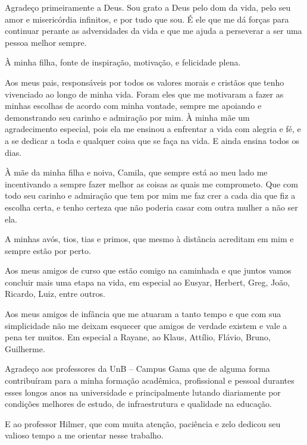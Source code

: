 \begin{agradecimentos}
Agradeço primeiramente a Deus. Sou grato a Deus pelo dom da vida, pelo seu amor e misericórdia infinitos, e por tudo que sou. É ele que me dá forças para continuar perante as adversidades da vida e que me ajuda a perseverar a ser uma pessoa melhor sempre.

À minha filha, fonte de inspiração, motivação, e felicidade plena.

Aos meus pais, responsáveis por todos os valores morais e cristãos que tenho vivenciado ao longo de minha vida. Foram eles que me motivaram a fazer as minhas escolhas de acordo com minha vontade, sempre me apoiando e demonstrando seu carinho e admiração por mim. À minha mãe um agradecimento especial, pois ela me ensinou a enfrentar a vida com alegria e fé, e a se dedicar a toda e qualquer coisa que se faça na vida. E ainda ensina todos os dias.

À mãe da minha filha e noiva, Camila, que sempre está ao meu lado me incentivando a sempre fazer melhor as coisas as quais me comprometo. Que com todo seu carinho e admiração que tem por mim me faz crer a cada dia que fiz a escolha certa, e tenho certeza que não poderia casar com outra mulher a não ser ela.

A minhas avós, tios, tias e primos, que mesmo à distância acreditam em mim e sempre estão por perto.

Aos meus amigos de curso que estão comigo na caminhada e que juntos 
vamos concluir mais uma etapa na vida, em especial ao Eusyar, Herbert, Greg, João, Ricardo, Luiz, entre outros.

Aos meus amigos de infância que me atuaram a tanto tempo e que com sua simplicidade não me deixam esquecer que amigos de verdade existem e vale a pena ter muitos. Em especial a Rayane, ao Klaus, Attílio, Flávio, Bruno, Guilherme.

Agradeço aos professores da UnB – Campus Gama que de alguma forma contribuíram para a minha formação acadêmica, profissional e pessoal durantes esses longos anos na universidade e principalmente lutando diariamente por condições melhores de estudo, de infraestrutura e qualidade na educação.

E ao professor Hilmer, que com muita atenção, paciência e zelo dedicou seu valioso tempo a me orientar nesse trabalho.
\end{agradecimentos}
